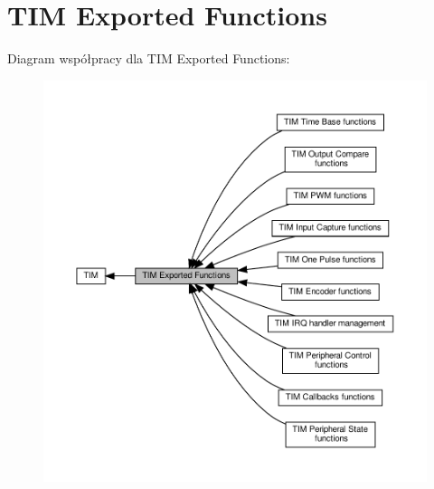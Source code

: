 \hypertarget{group___t_i_m___exported___functions}{}\section{T\+IM Exported Functions}
\label{group___t_i_m___exported___functions}
Diagram współpracy dla T\+IM Exported Functions\+:\nopagebreak
\begin{figure}[H]
\begin{center}
\leavevmode
\includegraphics[width=350pt]{group___t_i_m___exported___functions}
\end{center}
\end{figure}
